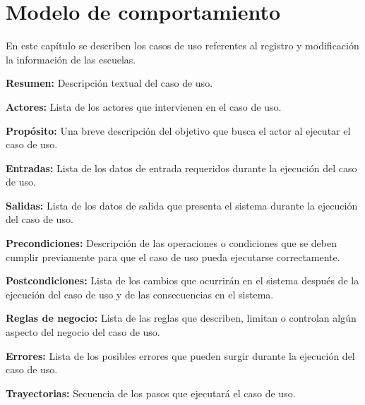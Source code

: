 \documentclass[10pt]{book}
\begin{document}
 \chapter{Modelo de comportamiento}\label{chp:modeloComportamiento}
     En este capítulo se describen los casos de uso referentes al registro y modificación la información de las escuelas. \bigskip
     
    \begin{objetivos}
	\item {\bf Resumen:} Descripción textual del caso de uso.
	\item {\bf Actores:} Lista de los actores que intervienen en el caso de uso.
	\item {\bf Propósito:} Una breve descripción del objetivo que busca el actor al ejecutar el caso de uso.
	\item {\bf Entradas:} Lista de los datos de entrada requeridos durante la ejecución del caso de uso.
	\item {\bf Salidas:} Lista de los datos de salida que presenta el sistema durante la ejecución del caso de uso.
	\item {\bf Precondiciones:} Descripción de las operaciones o condiciones que se deben cumplir previamente para que el caso de uso pueda ejecutarse correctamente.
	\item {\bf Postcondiciones:} Lista de los cambios que ocurrirán en el sistema después de la ejecución del caso de uso y de las consecuencias en el sistema.
	\item {\bf Reglas de negocio:} Lista de las reglas que describen, limitan o controlan algún aspecto del negocio del caso de uso.
	\item {\bf Errores:} Lista de los posibles errores que pueden surgir durante la ejecución del caso de uso.
	\item {\bf Trayectorias:} Secuencia de los pasos que ejecutará el caso de uso.
    \end{objetivos}

\end{document}
